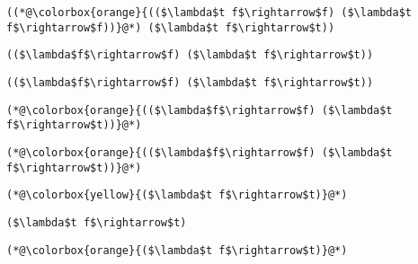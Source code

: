 \documentclass{beamer}
\begin{document}
\begin{frame}[fragile]{\CurrentSection}
\lstset{basicstyle=\ttfamily\small}\lstset{numbers=none}\lstset{language=ML}\begin{lstlisting}
((*@\colorbox{orange}{(($\lambda$t f$\rightarrow$f) ($\lambda$t f$\rightarrow$f))}@*) ($\lambda$t f$\rightarrow$t))
\end{lstlisting}
\pause\lstset{language=ML}\begin{lstlisting}
(($\lambda$f$\rightarrow$f) ($\lambda$t f$\rightarrow$t))
\end{lstlisting}

\end{frame}

\begin{frame}[fragile]{\CurrentSection}
\lstset{basicstyle=\ttfamily\small}\lstset{numbers=none}\lstset{language=ML}\begin{lstlisting}
(($\lambda$f$\rightarrow$f) ($\lambda$t f$\rightarrow$t))
\end{lstlisting}
\pause\lstset{language=ML}\begin{lstlisting}
(*@\colorbox{orange}{(($\lambda$f$\rightarrow$f) ($\lambda$t f$\rightarrow$t))}@*)
\end{lstlisting}

\end{frame}

\begin{frame}[fragile]{\CurrentSection}
\lstset{basicstyle=\ttfamily\small}\lstset{numbers=none}\lstset{language=ML}\begin{lstlisting}
(*@\colorbox{orange}{(($\lambda$f$\rightarrow$f) ($\lambda$t f$\rightarrow$t))}@*)
\end{lstlisting}
\pause\lstset{language=ML}\begin{lstlisting}
(*@\colorbox{yellow}{($\lambda$t f$\rightarrow$t)}@*)
\end{lstlisting}

\end{frame}

\begin{frame}[fragile]{\CurrentSection}
\lstset{basicstyle=\ttfamily\small}\lstset{numbers=none}\lstset{language=ML}\begin{lstlisting}
($\lambda$t f$\rightarrow$t)
\end{lstlisting}
\pause\lstset{language=ML}\begin{lstlisting}
(*@\colorbox{orange}{($\lambda$t f$\rightarrow$t)}@*)
\end{lstlisting}

\end{frame}
\end{document}
